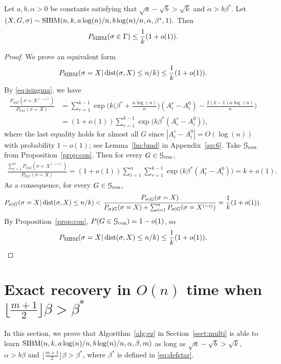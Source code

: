 \documentclass{article}
\begin{document}
\begin{proposition}  \label{prop:zj}
	Let $a,b,\alpha> 0$ be constants satisfying that $\sqrt{a}-\sqrt{b} > \sqrt{k}$ and $\alpha>b\beta^\ast$. Let 
	$
	(X,G,\sigma) \sim \operatorname{SIBM}(n,k, a\log(n)/n, b\log(n)/n,\alpha,\beta^\ast, 1) .
	$
	Then 
	$$
	P_{\operatorname{SIBM}}(\sigma \in \Gamma) \le \frac{1}{k}(1+o(1)) .
	$$
\end{proposition}
\begin{proof}
	We prove an equivalent form
	$$
	P_{\operatorname{SIBM}}(\sigma = X | \operatorname{dist}(\sigma, X) \le n/k) \le \frac{1}{k}(1+o(1)) .
	$$
	By \eqref{eq:isingma}, we have
	\begin{align*}
	\frac{P_{\sigma|G}(\sigma=X^{(\sim i)} )}
	{P_{\sigma|G}(\sigma=X)}
	& = \sum_{r=1}^{k-1}\exp\Big(k\big(\beta^\ast+\frac{\alpha\log(n)}{n} \big) (A^r_i-A^0_i)
	-\frac{2(k-1)\alpha\log(n)}{n} \Big) \\
	& = (1+o(1))\sum_{r=1}^{k-1} \exp\big(k\beta^\ast (A^r_i-A^0_i) \big)  ,
	\end{align*}
	where the last equality holds for almost all $G$ since $|A^r_i-A^0_i|=O(\log(n))$ with probability $1-o(1)$; see Lemma~\ref{lm:bmd} in Appendix~\ref{ap:6}.
	Take $\mathcal{G}_{\operatorname{con}}$ from Proposition~\ref{prop:con}. Then for every $G\in\mathcal{G}_{\operatorname{con}}$,
	\begin{align*}
	\frac{\sum_{i=1}^n P_{\sigma|G}(\sigma=X^{(\sim i)} )}
	{P_{\sigma|G}(\sigma=X)}  = (1+o(1)) \sum_{i=1}^n \sum_{r=1}^{k-1}\exp\big(k\beta^\ast (A^r_i-A^0_i) \big)  =k+o(1) .
	\end{align*}
	As a consequence, for every $G\in\mathcal{G}_{\operatorname{con}}$,
	\begin{align*}
	P_{\sigma|G} (\sigma= X | \operatorname{dist}(\sigma, X) \le n/k ) <
	\frac {P_{\sigma|G}(\sigma=X)}
	{P_{\sigma|G}(\sigma=X)+\sum_{i=1}^n P_{\sigma|G}(\sigma=X^{(\sim i)} )}
	=\frac{1}{k} (1+o(1)) .
	\end{align*}
	By Proposition~\ref{prop:con}, $P(G\in\mathcal{G}_{\operatorname{con}})=1-o(1)$, so
	$$
	P_{\operatorname{SIBM}}(\sigma= X | \operatorname{dist}(\sigma, X) \le n/k ) \le \frac{1}{k}(1+o(1)) .
	$$
\end{proof}
\section{Exact recovery in $O(n)$ time when $\lfloor \frac{m+1}{2} \rfloor \beta>\beta^\ast$}
\label{sect:direct}
In this section, we prove that Algorithm~\ref{alg:ez} in Section~\ref{sect:multi} is able to learn $\SIBM(n,k,a\log(n)/n, \linebreak[4] b\log(n)/n,\alpha,\beta, m)$ as long as $\sqrt{a}-\sqrt{b} > \sqrt{k}$,  $\alpha>b\beta$ and $\lfloor \frac{m+1}{2} \rfloor \beta>\beta^\ast$, where $\beta^\ast$ is defined in \eqref{eq:defstar}.
\end{document}
